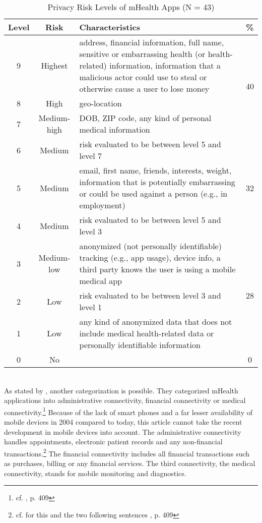 \begin{table}[!htb]
    \center
    \begin{tabular}{c | c | p{22.5em} | c}
        \textbf{Level} & \textbf{Risk} & \textbf{Characteristics} & \textbf{\%\footnotemark}\\
        \hline
        9 & Highest & address, financial information, full name, sensitive or embarrassing health (or health-related) information, information that a malicious actor could use to steal or otherwise cause a user to lose money & \multirow{3}[20]{*}{40} \\
        \cline{1-3}
        8 & High & geo-location & \\
        \cline{1-3}
        7 & Medium-high & DOB, ZIP code, any kind of personal medical
information & \\
        \hline
        6 & Medium & risk evaluated to be between level 5 and level 7 & \multirow{3}[12]{*}{32} \\
        \cline{1-3}
        5 & Medium & email, first name, friends, interests, weight, information that is potentially embarrassing or could be used against a person (e.g., in employment)\\
        \cline{1-3}
        4 & Medium & risk evaluated to be between level 5 and level 3\\
        \hline
        3 & Medium-low & anonymized (not personally identifiable) tracking (e.g., app usage), device info, a third party knows the user is using a mobile medical app & \multirow{3}[22]{*}{28} \\
        \cline{1-3}
        2 & Low & risk evaluated to be between level 3 and level 1\\
        \cline{1-3}
        1 & Low & any kind of anonymized data that does not include medical
health-related data or personally identifiable information\\
        \hline
        0 & No & & 0 \\
    \end{tabular}
    \caption[Privacy Risk Levels of mHealth Apps]{Privacy Risk Levels of mHealth Apps (N = 43)\footnotemark}
    \label{tab:RiskLevelsmHealth}
\end{table}
\addtocounter{footnote}{-1}
\addtocounter{footnote}{1}
\\
As stated by \cite{Istepanian.2004}, another categorization is possible. They categorized mHealth applications into administrative connectivity, financial connectivity or medical connectivity.\footnote{cf. \cite{Istepanian.2004}, p. 409} Because of the lack of smart phones and a far lesser availability of mobile devices in 2004 compared to today, this article cannot take the recent development in mobile devices into account. The administrative connectivity handles appointments, electronic patient records and any non-financial transactions.\footnote{cf. for this and the two following sentences \cite{Istepanian.2004}, p. 409} The financial connectivity includes all financial transactions such as purchases, billing or any financial services. The third connectivity, the medical connectivity, stands for mobile monitoring and diagnostics.
